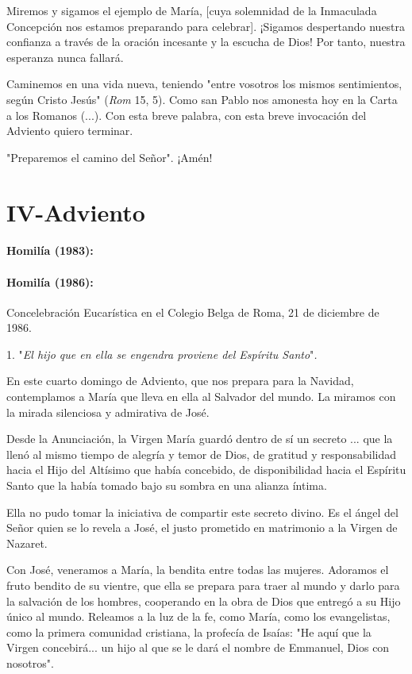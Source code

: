 \begin{body}
\begin{body}
Miremos y sigamos el ejemplo de María, {[}cuya solemnidad de la Inmaculada Concepción nos estamos preparando para celebrar{]}. ¡Sigamos despertando nuestra confianza a través de la oración incesante y la escucha de Dios! Por tanto, nuestra esperanza nunca fallará.

Caminemos en una vida nueva, teniendo "entre vosotros los mismos sentimientos, según Cristo Jesús" (\emph{Rom} 15, 5). Como san Pablo nos amonesta hoy en la Carta a los Romanos (...). Con esta breve palabra, con esta breve invocación del Adviento quiero terminar.

"Preparemos el camino del Señor". ¡Amén!
\end{body} 
	
\chapter{IV-Adviento}

\subsubsection{Homilía (1983): }

\subsubsection{Homilía (1986): }

Concelebración Eucarística en el Colegio Belga de Roma, 21 de diciembre de 1986.

\begin{body} 
1. "\emph{El hijo que en ella se engendra proviene del Espíritu Santo}"\emph{.}

En este cuarto domingo de Adviento, que nos prepara para la Navidad, contemplamos a María que lleva en ella al Salvador del mundo. La miramos con la mirada silenciosa y admirativa de José.

Desde la Anunciación, la Virgen María guardó dentro de sí un secreto ... que la llenó al mismo tiempo de alegría y temor de Dios, de gratitud y responsabilidad hacia el Hijo del Altísimo que había concebido, de disponibilidad hacia el Espíritu Santo que la había tomado bajo su sombra en una alianza íntima.

Ella no pudo tomar la iniciativa de compartir este secreto divino. Es el ángel del Señor quien se lo revela a José, el justo prometido en matrimonio a la Virgen de Nazaret.

Con José, veneramos a María, la bendita entre todas las mujeres. Adoramos el fruto bendito de su vientre, que ella se prepara para traer al mundo y darlo para la salvación de los hombres, cooperando en la obra de Dios que entregó a su Hijo único al mundo. Releamos a la luz de la fe, como María, como los evangelistas, como la primera comunidad cristiana, la profecía de Isaías: "He aquí que la Virgen concebirá... un hijo al que se le dará el nombre de Emmanuel, Dios con nosotros".


\end{body}
\end{body}
